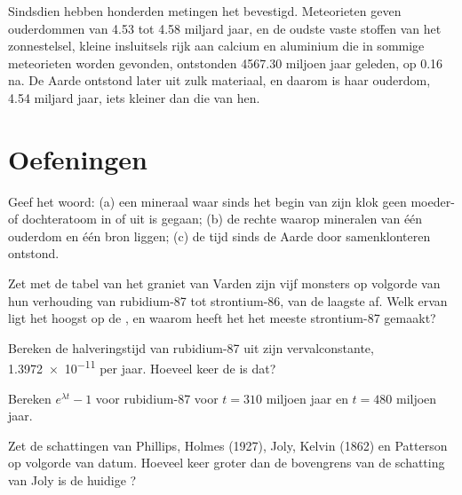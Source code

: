 Sindsdien hebben honderden metingen het bevestigd. Meteorieten geven ouderdommen
van 4.53 tot 4.58 miljard jaar, en de oudste vaste stoffen van het zonnestelsel,
kleine insluitsels rijk aan calcium en aluminium die in sommige meteorieten worden gevonden,
ontstonden \num{4567.30} miljoen jaar geleden, op 0.16 na. De Aarde ontstond
later uit zulk materiaal, en daarom is haar ouderdom, 4.54 miljard jaar, iets
kleiner dan die van hen.

\section{Oefeningen}

\begin{exercise}[$\star$]\label{exo:g12:age-of-the-earth:1}
Geef het woord: (a) een mineraal waar sinds het begin van zijn klok geen moeder- of dochteratoom
in of uit is gegaan; (b) de rechte waarop mineralen van
één ouderdom en één bron liggen; (c) de tijd sinds de Aarde door
samenklonteren ontstond.
\end{exercise}

\begin{exercise}[$\star$]\label{exo:g12:age-of-the-earth:2}
Zet met de tabel van het graniet van Varden zijn vijf monsters op volgorde van
hun verhouding van rubidium-87 tot strontium-86, van de laagste af. Welk ervan
ligt het hoogst op de , en waarom heeft het het meeste strontium-87 gemaakt?
\end{exercise}

\begin{exercise}[$\star$]\label{exo:g12:age-of-the-earth:3}
Bereken de halveringstijd van rubidium-87 uit zijn vervalconstante,
\num{1.3972e-11} per jaar. Hoeveel keer de  is dat?
\end{exercise}

\begin{exercise}[$\star$]\label{exo:g12:age-of-the-earth:4}
Bereken $e^{\lambda t} - 1$ voor rubidium-87 voor $t = 310$ miljoen jaar en
$t = 480$ miljoen jaar.
\end{exercise}

\begin{exercise}[$\star$]\label{exo:g12:age-of-the-earth:5}
Zet de schattingen van Phillips, Holmes (1927), Joly, Kelvin
(1862) en Patterson op volgorde van datum. Hoeveel keer groter dan de bovengrens van de schatting van Joly
is de huidige ?
\end{exercise}

